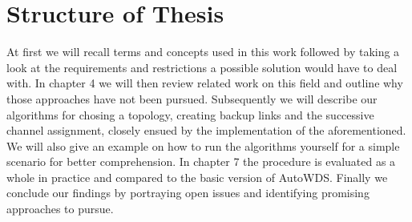 \section{Structure of Thesis}
  At first we will recall terms and concepts used in this work followed by taking a look at the requirements and restrictions a possible solution would have to deal with.
  In chapter 4 we will then review related work on this field and outline why those approaches have not been pursued.
  Subsequently we will describe our algorithms for chosing a topology, creating backup links and the successive channel assignment, closely ensued by the implementation of 
  the aforementioned. We will also give an example on how to run the algorithms yourself for a simple scenario for better comprehension.
  In chapter 7 the procedure is evaluated as a whole in practice and compared to the basic version of AutoWDS.
  Finally we conclude our findings by portraying open issues and identifying promising approaches to pursue.

